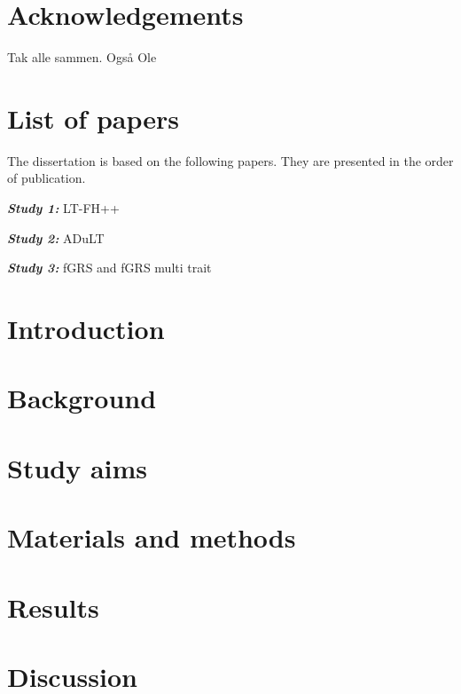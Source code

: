 \documentclass[a4paper, twoside]{report}
\begin{document}
\chapter*{Acknowledgements}
Tak alle sammen.
Også Ole

\chapter*{List of papers}

The dissertation is based on the following papers. They are presented in the order of publication.

\textbf{\textit{Study 1:}} LT-FH++

\textbf{\textit{Study 2:}} ADuLT

\textbf{\textit{Study 3:}} fGRS and fGRS multi trait


\tableofcontents
\newpage

\chapter{Introduction}


\chapter{Background}


\chapter{Study aims}


\chapter{Materials and methods}



\chapter{Results}



\chapter{Discussion}

\end{document}
